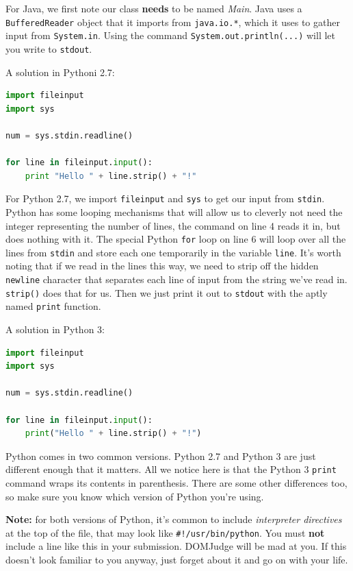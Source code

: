 \documentclass[a4paper]{article}
\begin{document}
For Java, we first note our class \textbf{needs} to be named \textit{Main}. Java uses a \texttt{BufferedReader} object that it imports from \texttt{java.io.*}, which it uses to gather input from \texttt{System.in}. Using the command \texttt{System.out.println(...)} will let you write to \texttt{stdout}.

A solution in Pythoni 2.7:
\begin{lstlisting}[language=Python]
import fileinput
import sys

num = sys.stdin.readline()

for line in fileinput.input():
    print "Hello " + line.strip() + "!"
\end{lstlisting}

For Python 2.7, we import \texttt{fileinput} and \texttt{sys} to get our input from \texttt{stdin}. Python has some looping mechanisms that will allow us to cleverly not need the integer representing the number of lines, the command on line 4 reads it in, but does nothing with it. The special Python \texttt{for} loop on line 6 will loop over all the lines from \texttt{stdin} and store each one temporarily in the variable \texttt{line}. It's worth noting that if we read in the lines this way, we need to strip off the hidden \texttt{newline} character that separates each line of input from the string we've read in. \texttt{strip()} does that for us. Then we just print it out to \texttt{stdout} with the aptly named \texttt{print} function.
\newpage

A solution in Python 3:
\begin{lstlisting}[language=Python]
import fileinput
import sys

num = sys.stdin.readline()

for line in fileinput.input():
    print("Hello " + line.strip() + "!")
\end{lstlisting}
Python comes in two common versions. Python 2.7 and Python 3 are just different enough that it matters. All we notice here is that the Python 3 \texttt{print} command wraps its contents in parenthesis. There are some other differences too, so make sure you know which version of Python you're using. 

\textbf{Note:} for both versions of Python, it's common to include \textit{interpreter directives} at the top of the file, that may look like \texttt{\#!/usr/bin/python}. You must \textbf{not} include a line like this in your submission. DOMJudge will be mad at you. If this doesn't look familiar to you anyway, just forget about it and go on with your life. 
\end{document}
